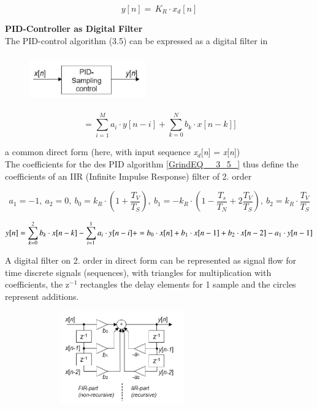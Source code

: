 \begin{equation}
	y[n]=\, K_{R} \cdot x_{d} [n]
\label{EQ }
\end{equation}

{\rot\bf PID-Controller as Digital Filter }\\

The PID-control algorithm (3.5) can be expressed as a digital filter in  

	\begin{figure}[h]
    \centering
    \includegraphics[width=5cm, height=2cm]{Images/image151.png}
    \label{fig:Fig 104}
    \end{figure}
    
\begin{equation}
	[y[n]=\sum _{i=1}^{M}a_{i} \cdot y[n-i] +\sum _{k=0}^{N}b_{k} \cdot x[n-k]]
\label{EQ }
\end{equation}

a common direct form (here, with input sequence \textit{x${}_{d}$}[\textit{n}] = \textit{x}[\textit{n}]) \\

The coefficients for the des PID algorithm \eqref{GrindEQ__3_5_} thus define the coefficients of an  IIR (Infinite Impulse Response) filter of 2. order

\begin{equation*}
	a_1=-1,\ a_2=0,\ b_0=k_R \cdot \left(1+\frac{T_V}{T_S}\right),\ b_1=-k_R \cdot \left(1-\frac{T_s}{T_N}+2 \frac{T_V}{T_S}\right),\ b_2=k_R \cdot \frac{T_V}{T_S}
\label{EQ }
\end{equation*}

\begin{equation*}
	y[n] = {\sum_{k=0}^{2}b_{k} \cdot x[n-k] - \sum_{i=1}^{1}a_{i} \cdot y[n-i] +} \\ = b_{0} \cdot x[n]+b_{1} \cdot x[n-1]+b_{2} \cdot x[n-2] - a_{1} \cdot y[n-1]
\label{EQ }
\end{equation*}

A digital filter on 2. order in direct form can be represented as signal flow for time discrete signals (sequences), with triangles for multiplication with coefficients, the z${}^{-1\ \ }$rectangles the delay elements for 1 sample and the circles represent additions.

	\begin{figure}[h]
    \centering
    \includegraphics[width=8cm, height=4cm]{Images/image152.png}
    \label{fig:Fig 105}
    \end{figure}

